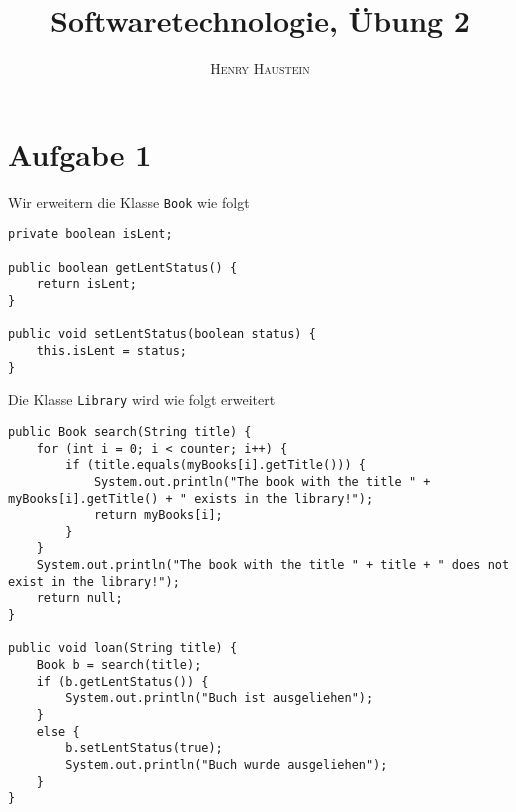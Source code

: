 \documentclass{article}
\title{\textbf{Softwaretechnologie, Übung 2}}
\author{\textsc{Henry Haustein}}
\date{}
\begin{document}
	\maketitle
	
	\section*{Aufgabe 1}
	Wir erweitern die Klasse \texttt{Book} wie folgt
	\begin{lstlisting}[style=java,tabsize=2]
private boolean isLent;

public boolean getLentStatus() {
	return isLent;
}

public void setLentStatus(boolean status) {
	this.isLent = status;
}
	\end{lstlisting}
	Die Klasse \texttt{Library} wird wie folgt erweitert
	\begin{lstlisting}[style=java,tabsize=2]
public Book search(String title) {
	for (int i = 0; i < counter; i++) {
		if (title.equals(myBooks[i].getTitle())) {
			System.out.println("The book with the title " + myBooks[i].getTitle() + " exists in the library!");
			return myBooks[i];
		}
	}
	System.out.println("The book with the title " + title + " does not exist in the library!");
	return null;
}

public void loan(String title) {
	Book b = search(title);
	if (b.getLentStatus()) {
		System.out.println("Buch ist ausgeliehen");
	}
	else {
		b.setLentStatus(true);
		System.out.println("Buch wurde ausgeliehen");
	}
}
	\end{lstlisting}
\end{document}

